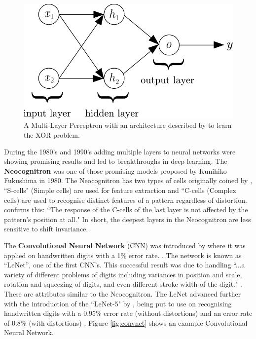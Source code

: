 \documentclass[report, 11pt, oneside]{dissertation}
\begin{document}
\begin{figure}[!htb]
	\centering
	\includegraphics[scale=0.75]{figure_4}
	\caption[A Multi-Layer Perceptron.]{A Multi-Layer Perceptron with an architecture described by \citep{Rumelhart:1986:LIR:104279.104293} to learn the XOR problem.}
	\label{fig:mlp_xor}
\end{figure}

During the 1980’s and 1990's adding multiple layers to neural networks were showing promising results and led to breakthroughs in deep learning. The \textbf{Neocognitron} was one of those promising models proposed by Kunihiko Fukushima in 1980. The Neocognitron has two types of cells originally coined by \citep[109]{hubel1962receptive}, ``S-cells" (Simple cells) are used for feature extraction and ``C-cells (Complex cells) are used to recognise distinct features of a pattern regardless of distortion. \citep[193]{fukushima1980neocognitron} confirms this: ``The response of the C-cells of the last layer is not affected by the pattern's position at all." In short, the deepest layers in the Neocognitron are less sensitive to shift invariance.

The \textbf{Convolutional Neural Network} (CNN) was introduced by \citeauthor{LeCun:NIPS1989_293} where it was applied on handwritten digits with a 1\% error rate. \citeyearpar[11]{LeCun:NIPS1989_293}. The network is known as  ``LeNet”, one of the first CNN’s. This successful result was due to handling ``...a variety of different problems of digits including variances in position and scale, rotation and squeezing of digits, and even different stroke width of the digit." \citep[39]{wang:2017}. These are attributes similar to the Neocognitron.  The LeNet advanced further with the introduction of the ``LeNet-5" by \citeauthor{LeCun:98}, being put to use on recognising handwritten digits with a 0.95\% error rate (without distortions) and an error rate of 0.8\% (with distortions) \citeyearpar[2288]{LeCun:98}. Figure \ref{fig:convnet} shows an example Convolutional Neural Network.
\end{document}
